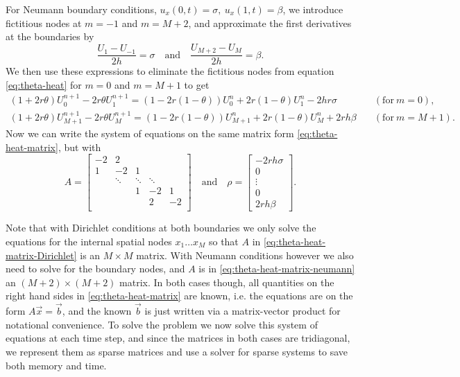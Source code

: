 For Neumann boundary conditions, $u_x(0, t) = \sigma, \: u_x(1, t) = \beta$, 
we introduce fictitious nodes at $m=-1$ and $m=M+2$, 
and approximate the first derivatives at the boundaries by
\begin{equation*}
    \frac{U_1 - U_{-1}}{2h} = \sigma
    \quad \text{and} \quad
    \frac{U_{M+2} - U_{M}}{2h} = \beta. 
\end{equation*}
We then use these expressions to eliminate the fictitious nodes from equation \eqref{eq:theta-heat} for $m=0$ and $m=M+1$ to get
\begin{align*}
    \left(1+2r\theta\right)U_0^{n+1} - 2r\theta U_1^{n+1} = \left(1-2r(1-\theta)\right)U_0^n + 2r\left(1-\theta\right)U_1^n - 2hr\sigma
    \quad & (\text{for} \: m=0), \\
    \left(1+2r\theta\right)U_{M+1}^{n+1} - 2r\theta U_M^{n+1} = \left(1-2r(1-\theta)\right)U_{M+1}^n + 2r\left(1-\theta\right)U_M^n + 2rh\beta
    \quad & (\text{for} \: m=M+1). 
\end{align*}
Now we can write the system of equations on the same matrix form \eqref{eq:theta-heat-matrix}, 
but with 
\begin{equation}
    A = 
    \begin{bmatrix}
    -2 & 2 \\
    1 & -2 & 1 & \\
      & \ddots & \ddots & \ddots & \\
      &   & 1 & -2 & 1 \\
      &   &  & 2 & -2 \\
    \end{bmatrix}
    \quad \text{and} \quad
    \rho = 
    \begin{bmatrix}
        -2rh\sigma \\ 0 \\ \vdots \\ 0 \\ 2rh\beta
    \end{bmatrix}
    .
    \label{eq:theta-heat-matrix-neumann}
\end{equation}

Note that with Dirichlet conditions at both boundaries we only solve the equations for the internal spatial nodes $x_1 \dots x_M$ so that $A$ in \eqref{eq:theta-heat-matrix-Dirichlet} is an $M \times M$ matrix. 
With Neumann conditions however we also need to solve for the boundary nodes, 
and $A$ is in \eqref{eq:theta-heat-matrix-neumann} an $(M+2) \times (M+2)$ matrix. 
In both cases though, all quantities on the right hand sides in \eqref{eq:theta-heat-matrix} are known, 
i.e. the equations are on the form $A\vec{x}=\vec{b}$, 
and the known $\vec{b}$ is just written via a matrix-vector product for notational convenience. 
To solve the problem we now solve this system of equations at each time step, 
and since the matrices in both cases are tridiagonal, 
we represent them as sparse matrices and use a solver for sparse systems to save both memory and time. 

